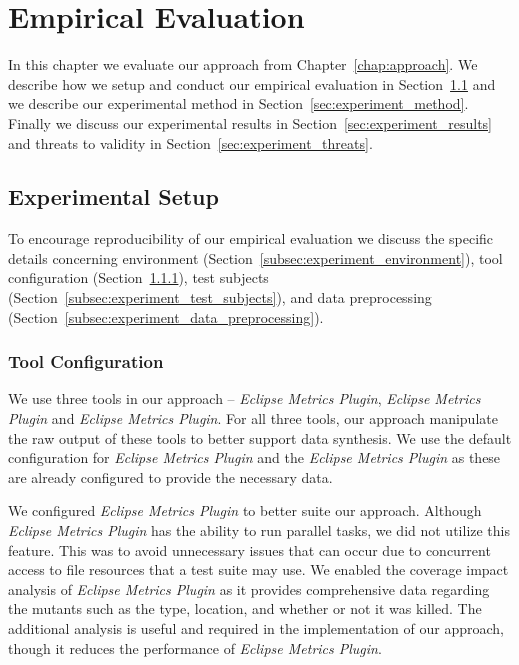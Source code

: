 \chapter{Empirical Evaluation}
\label{chap:experiment}
In this chapter we evaluate our approach from Chapter~\ref{chap:approach}. We describe how we setup and conduct our empirical evaluation in Section~\ref{sec:experiment_setup} and we describe our experimental method in Section~\ref{sec:experiment_method}. Finally we discuss our experimental results in Section~\ref{sec:experiment_results} and threats to validity in Section~\ref{sec:experiment_threats}.


\section{Experimental Setup}
\label{sec:experiment_setup}
To encourage reproducibility of our empirical evaluation we discuss the specific details concerning environment (Section~\ref{subsec:experiment_environment}), tool configuration (Section~\ref{subsec:experiment_tool_configuration}), test subjects (Section~\ref{subsec:experiment_test_subjects}), and data preprocessing (Section~\ref{subsec:experiment_data_preprocessing}).


\subsection{Tool Configuration}
\label{subsec:experiment_tool_configuration}
We use three tools in our approach -- \emph{Eclipse Metrics Plugin}, \emph{Eclipse Metrics Plugin} and \emph{Eclipse Metrics Plugin}. For all three tools, our approach manipulate the raw output of these tools to better support data synthesis. We use the default configuration for \emph{Eclipse Metrics Plugin} and the \emph{Eclipse Metrics Plugin} as these are already configured to provide the necessary data.

We configured \emph{Eclipse Metrics Plugin} to better suite our approach. Although \emph{Eclipse Metrics Plugin} has the ability to run parallel tasks, we did not utilize this feature. This was to avoid unnecessary issues that can occur due to concurrent access to file resources that a test suite may use. We enabled the coverage impact analysis of \emph{Eclipse Metrics Plugin} as it provides comprehensive data regarding the mutants such as the type, location, and whether or not it was killed. The additional analysis is useful and required in the implementation of our approach, though it reduces the performance of \emph{Eclipse Metrics Plugin}.

